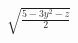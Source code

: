 \documentclass[preview]{standalone}
\begin{document}
\begin{center}
$\sqrt{\frac{5-3y^2-z}{2}}$
\end{center}
\end{document}
